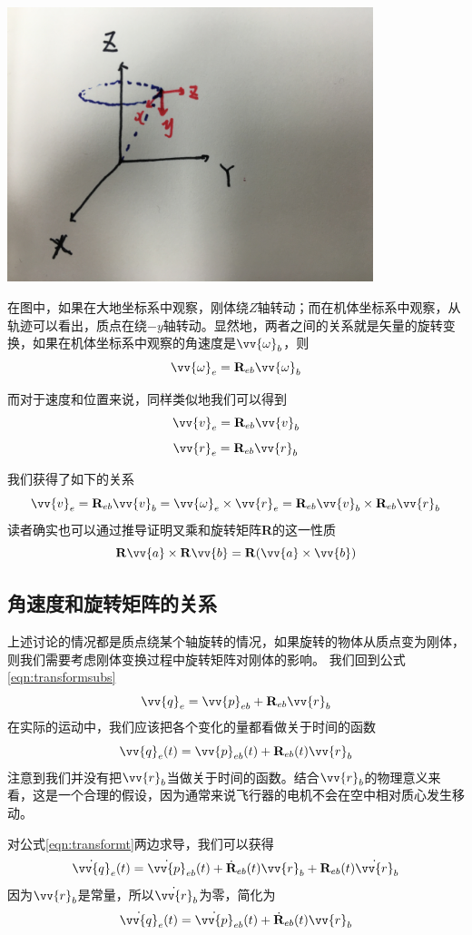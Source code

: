 \documentclass[11pt]{article}
\begin{document}
\begin{center}
\includegraphics[width=0.8\textwidth]{images/IMG_2383.jpg}
\end{center}

在图中，如果在大地坐标系中观察，刚体绕$Z$轴转动；而在机体坐标系中观察，从轨迹可以看出，质点在绕$-y$轴转动。显然地，两者之间的关系就是矢量的旋转变换，如果在机体坐标系中观察的角速度是$\vv{\omega}_b$，则
$$
\vv{\omega}_e = {\bf R}_{eb}\vv{\omega}_b
$$

而对于速度和位置来说，同样类似地我们可以得到
$$
\vv{v}_e = {\bf R}_{eb}\vv{v}_b
$$
$$
\vv{r}_e = {\bf R}_{eb}\vv{r}_b
$$

我们获得了如下的关系
$$
\vv{v}_e = {\bf R}_{eb}\vv{v}_b = \vv{\omega}_e \times \vv{r}_e = {\bf R}_{eb}\vv{v}_b \times {\bf R}_{eb}\vv{r}_b
$$
读者确实也可以通过推导证明叉乘和旋转矩阵{\bf R}的这一性质
$$
{\bf R}\vv{a} \times {\bf R}\vv{b} = {\bf R}(\vv{a} \times \vv{b}) 
$$

\subsection{角速度和旋转矩阵的关系}
上述讨论的情况都是质点绕某个轴旋转的情况，如果旋转的物体从质点变为刚体，则我们需要考虑刚体变换过程中旋转矩阵对刚体的影响。
我们回到公式\ref{eqn:transformsubs}
$$
\vv{q}_{e} = \vv{p}_{eb} + {\bf R}_{eb}\vv{r}_b
$$
在实际的运动中，我们应该把各个变化的量都看做关于时间的函数
\begin{equation}\label{eqn:transformt}
\vv{q}_{e}(t) = \vv{p}_{eb}(t) + {\bf R}_{eb}(t)\vv{r}_b
\end{equation}
注意到我们并没有把$\vv{r}_b$当做关于时间的函数。结合$\vv{r}_b$的物理意义来看，这是一个合理的假设，因为通常来说飞行器的电机不会在空中相对质心发生移动。

对公式\ref{eqn:transformt}两边求导，我们可以获得
\begin{equation*}
\dot{\vv{q}}_{e}(t) =\dot{ \vv{p}}_{eb}(t) + \dot{{\bf R}}_{eb}(t)\vv{r}_b +{\bf R}_{eb}(t)  \dot{\vv{r}}_b
\end{equation*}
因为$\vv{r}_b$是常量，所以$\dot{\vv{r}}_{b}$为零，简化为
\begin{equation*}
\dot{\vv{q}}_{e}(t) =\dot{ \vv{p}}_{eb}(t) + \dot{{\bf R}}_{eb}(t)\vv{r}_b
\end{equation*}
\end{document}
